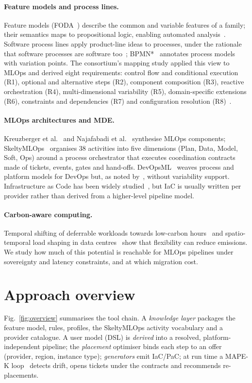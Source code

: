 \documentclass[10pt,a4paper]{article}
\begin{document}
\paragraph{Feature models and process lines.} Feature models (FODA~\cite{kang1990})
describe the common and variable features of a family; their semantics maps to
propositional logic, enabling automated analysis~\cite{batory2005,benavides2010}.
Software process lines apply product-line ideas to processes, under the rationale
that software processes are software too~\cite{osterweil1987}; BPMN*~\cite{terenciani2015}
annotates process models with variation points. The consortium's mapping study
applied this view to MLOps and derived eight requirements: control flow and
conditional execution (R1), optional and alternative steps (R2), component
composition (R3), reactive orchestration (R4), multi-dimensional variability (R5),
domain-specific extensions (R6), constraints and dependencies (R7) and
configuration resolution (R8)~\cite{elhatimi2025}.

\paragraph{MLOps architectures and MDE.} Kreuzberger et al.~\cite{kreuzberger2023}
and Najafabadi et al.~\cite{najafabadi2024} synthesise MLOps components;
SkeltyMLOps~\cite{daoud2025,daoud2026} organises 38 activities into five
dimensions (Plan, Data, Model, Soft, Ops) around a process orchestrator that
executes coordination contracts made of tickets, events, gates and hand-offs.
DevOpsML~\cite{colantoni2020} weaves process and platform models for DevOps but, as
noted by~\cite{elhatimi2025}, without variability support. Infrastructure as
Code has been widely studied~\cite{rahman2019}, but IaC is usually written per
provider rather than derived from a higher-level pipeline model.

\paragraph{Carbon-aware computing.} Temporal shifting of deferrable workloads
towards low-carbon hours~\cite{wiesner2021} and spatio-temporal load shaping in
data centres~\cite{radovanovic2023} show that flexibility can reduce emissions.
We study how much of this potential is reachable for MLOps pipelines under
sovereignty and latency constraints, and at which migration cost.

\section{Approach overview}
Fig.~\ref{fig:overview} summarises the tool chain. A \emph{knowledge layer} packages
the feature model, rules, profiles, the SkeltyMLOps activity vocabulary and a
provider catalogue. A user model (DSL) is \emph{derived} into a resolved,
platform-independent pipeline; the \emph{placement} optimiser binds each step to an
offer (provider, region, instance type); \emph{generators} emit IaC/PaC; at run
time a MAPE-K loop~\cite{kephart2003} detects drift, opens tickets under the
contracts and recommends re-placements.
\end{document}
